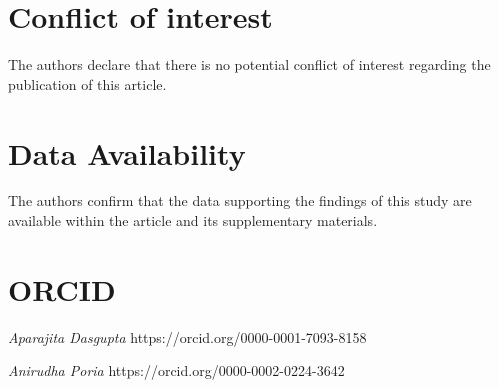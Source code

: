 \documentclass[a4paper,11pt, reqno]{amsart}
\theoremstyle{plain}
\theoremstyle{definition}
\theoremstyle{remark}
\begin{document}
\section*{Conflict of interest}
The authors declare that there is no potential conflict of interest regarding the publication of this article.

\section*{Data Availability}
The authors confirm that the data supporting the findings of this study are available within the article and its supplementary materials.

\section*{ORCID}
{\it Aparajita Dasgupta}  https://orcid.org/0000-0001-7093-8158 

{\it Anirudha Poria}  https://orcid.org/0000-0002-0224-3642
\end{document}
